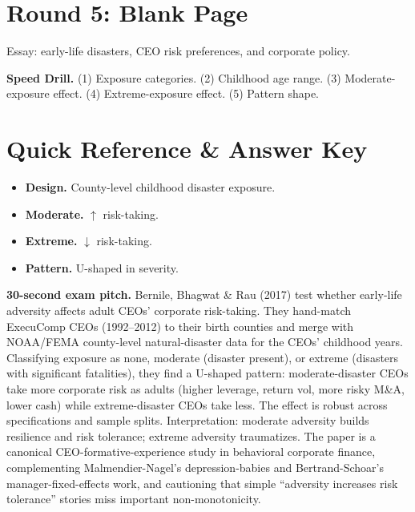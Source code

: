 \documentclass[11pt]{article}
\begin{document}
\section*{Round 5: Blank Page}
Essay: early-life disasters, CEO risk preferences, and corporate policy.

\vspace{6pt}
\begin{drillbox}
\textbf{Speed Drill.} (1) Exposure categories. (2) Childhood age range. (3) Moderate-exposure effect. (4) Extreme-exposure effect. (5) Pattern shape.
\end{drillbox}

\section*{Quick Reference \& Answer Key}
\begin{answerbox}
\begin{itemize}
\item \textbf{Design.} County-level childhood disaster exposure.
\item \textbf{Moderate.} $\uparrow$ risk-taking.
\item \textbf{Extreme.} $\downarrow$ risk-taking.
\item \textbf{Pattern.} U-shaped in severity.
\end{itemize}
\end{answerbox}

\begin{keybox}
\textbf{30-second exam pitch.} Bernile, Bhagwat \& Rau (2017) test whether early-life adversity affects adult CEOs' corporate risk-taking. They hand-match ExecuComp CEOs (1992--2012) to their birth counties and merge with NOAA/FEMA county-level natural-disaster data for the CEOs' childhood years. Classifying exposure as none, moderate (disaster present), or extreme (disasters with significant fatalities), they find a U-shaped pattern: moderate-disaster CEOs take more corporate risk as adults (higher leverage, return vol, more risky M\&A, lower cash) while extreme-disaster CEOs take less. The effect is robust across specifications and sample splits. Interpretation: moderate adversity builds resilience and risk tolerance; extreme adversity traumatizes. The paper is a canonical CEO-formative-experience study in behavioral corporate finance, complementing Malmendier-Nagel's depression-babies and Bertrand-Schoar's manager-fixed-effects work, and cautioning that simple ``adversity increases risk tolerance'' stories miss important non-monotonicity.
\end{keybox}
\end{document}

